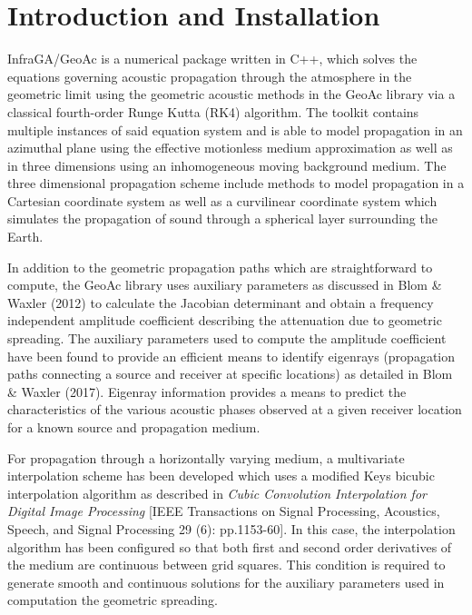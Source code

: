 \documentclass[10pt]{article}
\begin{document}
\newpage

\tableofcontents

\newpage
\section{Introduction and Installation}
\label{Sect:Intro_Install}
\hspace*{0.25in}  InfraGA/GeoAc is a numerical package written in C++, which solves the equations governing acoustic propagation through the atmosphere in the geometric limit using the geometric acoustic methods in the GeoAc library via a classical fourth-order Runge Kutta (RK4) algorithm.  The toolkit contains multiple instances of said equation system and is able to model propagation in an azimuthal plane using the effective motionless medium approximation as well as in three dimensions using an inhomogeneous moving background medium.  The three dimensional propagation scheme include methods to model propagation in a Cartesian coordinate system as well as a curvilinear coordinate system which simulates the propagation of sound through a spherical layer surrounding the Earth.

In addition to the geometric propagation paths which are straightforward to compute, the GeoAc library uses auxiliary parameters as discussed in Blom \& Waxler (2012) to calculate the Jacobian determinant and obtain a frequency independent amplitude coefficient describing the attenuation due to geometric spreading.  The auxiliary parameters used to compute the amplitude coefficient have been found to provide an efficient means to identify eigenrays (propagation paths connecting a source and receiver at specific locations) as detailed in Blom \& Waxler (2017).  Eigenray information provides a means to predict the characteristics of the various acoustic phases observed at a given receiver location for a known source and propagation medium.

For propagation through a horizontally varying medium, a multivariate interpolation scheme has been developed which uses a modified Keys bicubic interpolation algorithm as described in \textit{Cubic Convolution Interpolation for Digital Image Processing}  [IEEE Transactions on Signal Processing, Acoustics, Speech, and Signal Processing 29 (6): pp.1153-60].  In this case, the interpolation algorithm has been configured so that both first and second order derivatives of the medium are continuous between grid squares.  This condition is required to generate smooth and continuous solutions for the auxiliary parameters used in computation the geometric spreading.
\end{document}
